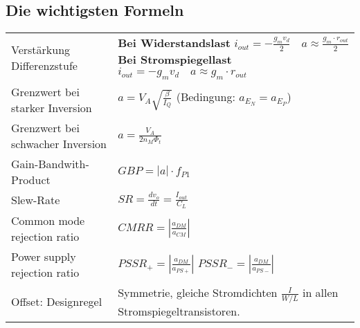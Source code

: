 \subsection{Die wichtigsten Formeln}
\begin{tabular}{p{7cm}p{11cm}}
Verstärkung Differenzstufe &
\textbf{Bei Widerstandslast} $i_{out}=-\frac{g_mv_d}{2} \quad a\approx\frac{g_m\cdot r_{out}}{2}$ \newline
\textbf{Bei Stromspiegellast} $i_{out}=-g_mv_d \quad a\approx g_m\cdot r_{out}$
\\
Grenzwert bei starker Inversion & $a=V_A\sqrt{\frac{\beta}{I_Q}}$ (Bedingung:
$a_{E_N}=a_{E_P}$)\\
Grenzwert bei schwacher Inversion & $a=\frac{V_A}{2n_M\Phi_t}$\\
Gain-Bandwith-Product & $GBP=|a|\cdot f_{P1}$ \\
Slew-Rate & $SR=\frac{dv_o}{dt}=\frac{I_{out}}{C_L}$ \\
Common mode rejection ratio & $CMRR=\left| \frac{a_{DM}}{a_{CM}}\right|$\\
Power supply rejection ratio &
$PSSR_+ = \left| \frac{a_{DM}}{a_{PS+}}\right|$ \newline
$PSSR_- = \left| \frac{a_{DM}}{a_{PS-}}\right|$ \\
Offset: Designregel & Symmetrie, gleiche Stromdichten $\frac{I}{W/L}$ in
allen Stromspiegeltransistoren. \\
\end{tabular}
